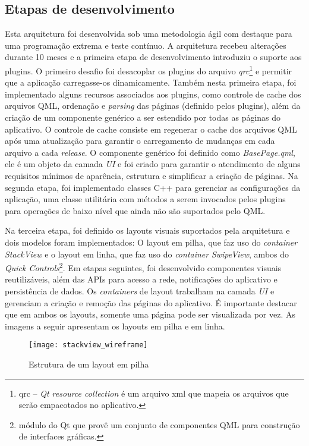\subsection{Etapas de desenvolvimento}
Esta arquitetura foi desenvolvida sob uma metodologia ágil com destaque para uma programação extrema e teste contínuo. A arquitetura recebeu alterações durante 10 meses e a primeira etapa de desenvolvimento introduziu o suporte aos plugins. O primeiro desafio foi desacoplar os plugins do arquivo \textit{qrc}\footnote{qrc – \textit{Qt resource collection} é um arquivo xml que mapeia os arquivos que serão empacotados no aplicativo.} e permitir que a aplicação carregasse-os dinamicamente. Também nesta primeira etapa, foi implementado alguns recursos associados aos plugins, como controle de cache dos arquivos QML, ordenação e \textit{parsing} das páginas (definido pelos plugins), além da criação de um componente genérico a ser estendido por todas as páginas do aplicativo. O controle de cache consiste em regenerar o cache dos arquivos QML após uma atualização para garantir o carregamento de mudanças em cada arquivo a cada \textit{release}. O componente genérico foi definido como \textit{BasePage.qml}, ele é um objeto da camada \textit{UI} e foi criado para garantir o atendimento de alguns requisitos mínimos de aparência, estrutura e simplificar a criação de páginas. Na segunda etapa, foi implementado classes C++ para gerenciar as configurações da aplicação, uma classe utilitária com métodos a serem invocados pelos plugins para operações de baixo nível que ainda não são suportados pelo QML.\par

Na terceira etapa, foi definido os layouts visuais suportados pela arquitetura e dois modelos foram implementados: O layout em pilha, que faz uso do \textit{container} \textit{StackView} e o layout em linha, que faz uso do \textit{container} \textit{SwipeView}, ambos do \textit{Quick Controls}\footnote{módulo do Qt que provê um conjunto de componentes QML para construção de interfaces gráficas.}. Em etapas seguintes, foi desenvolvido componentes visuais reutilizáveis, além das APIs para acesso a rede, notificações do aplicativo e persistência de dados. Os \textit{containers} de layout trabalham na camada \textit{UI} e gerenciam a criação e remoção das páginas do aplicativo. É importante destacar que em ambos os layouts, somente uma página pode ser visualizada por vez. As imagens a seguir apresentam os layouts em pilha e em linha.

\begin{figure}[H]
	\texttt{[image: stackview\_wireframe]}
	\centering
	\caption{Estrutura de um layout em pilha}
\end{figure}

